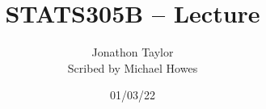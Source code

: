




\title{STATS305B -- Lecture }
\author{Jonathon Taylor\\ Scribed by Michael Howes}
\date{01/03/22}

\pagestyle{fancy}
\fancyhf{}


\maketitle
\tableofcontents
